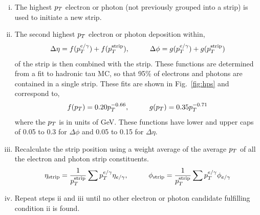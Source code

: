 \begin{enumerate}[i)]
\item The highest $p_{T}$ electron or photon (not previously grouped into a strip) is used to initiate a new strip.
\item The second highest $p_{T}$ electron or photon deposition within,
\begin{equation}
  \Delta \eta = f(p_{T}^{e/\gamma}) + f(p_{T}^{\text{strip}}), \hspace{1cm} \Delta \phi = g(p_{T}^{e/\gamma}) + g(p_{T}^{\text{strip}})
\end{equation}
of the strip is then combined with the strip.
These functions are determined from a fit to hadronic tau MC, so that 95\% of electrons and photons are contained in a single strip.
These fits are shown in Fig.~\ref{fig:hps} and correspond to,
\begin{equation}
f(p_{T}) = 0.20 p_{T}^{-0.66}, \hspace{1cm} g(p_{T}) = 0.35 p_{T}^{-0.71}
\end{equation}
where the $p_{T}$ is in units of GeV.
These functions have lower and upper caps of 0.05 to 0.3 for $\Delta\phi$ and 0.05 to 0.15 for $\Delta\eta$.
\item Recalculate the strip position using a weight average of the average $p_{T}$ of all the electron and photon strip constituents.
\begin{equation}
\eta_{\text{strip}} = \frac{1}{p_{T}^{\text{strip}}} \sum p_{T}^{e/\gamma} \eta_{e/\gamma}, \hspace{1cm} \phi_{\text{strip}} = \frac{1}{p_{T}^{\text{strip}}} \sum p_{T}^{e/\gamma} \phi_{e/\gamma}
\end{equation}
\item Repeat steps ii and iii until no other electron or photon candidate fulfilling condition ii is found.
\end{enumerate}

